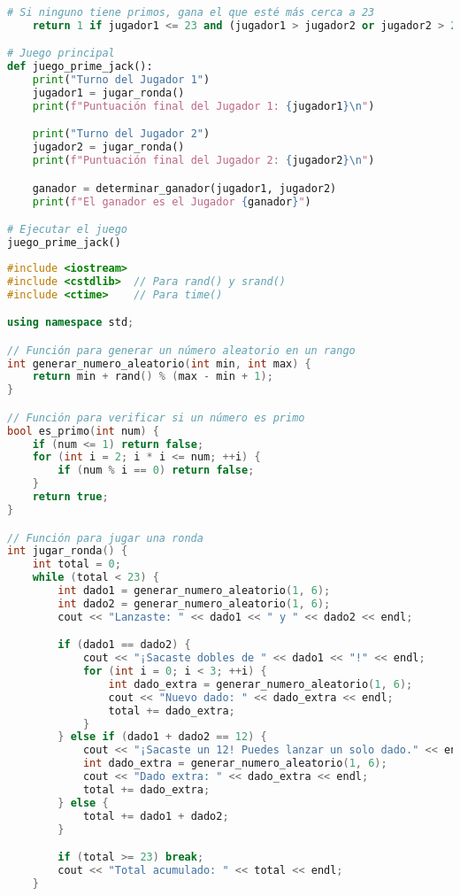 \documentclass{article}
\begin{document}
\begin{lstlisting}[language=Python, caption=Código en Python]
    # Si ninguno tiene primos, gana el que esté más cerca a 23
    return 1 if jugador1 <= 23 and (jugador1 > jugador2 or jugador2 > 23) else 2

# Juego principal
def juego_prime_jack():
    print("Turno del Jugador 1")
    jugador1 = jugar_ronda()
    print(f"Puntuación final del Jugador 1: {jugador1}\n")

    print("Turno del Jugador 2")
    jugador2 = jugar_ronda()
    print(f"Puntuación final del Jugador 2: {jugador2}\n")

    ganador = determinar_ganador(jugador1, jugador2)
    print(f"El ganador es el Jugador {ganador}")

# Ejecutar el juego
juego_prime_jack()

\end{lstlisting}
\begin{lstlisting}[language=C++, Caption=Código en C++]
    #include <iostream>
#include <cstdlib>  // Para rand() y srand()
#include <ctime>    // Para time()

using namespace std;

// Función para generar un número aleatorio en un rango
int generar_numero_aleatorio(int min, int max) {
    return min + rand() % (max - min + 1);
}

// Función para verificar si un número es primo
bool es_primo(int num) {
    if (num <= 1) return false;
    for (int i = 2; i * i <= num; ++i) {
        if (num % i == 0) return false;
    }
    return true;
}

// Función para jugar una ronda
int jugar_ronda() {
    int total = 0;
    while (total < 23) {
        int dado1 = generar_numero_aleatorio(1, 6);
        int dado2 = generar_numero_aleatorio(1, 6);
        cout << "Lanzaste: " << dado1 << " y " << dado2 << endl;

        if (dado1 == dado2) {
            cout << "¡Sacaste dobles de " << dado1 << "!" << endl;
            for (int i = 0; i < 3; ++i) {
                int dado_extra = generar_numero_aleatorio(1, 6);
                cout << "Nuevo dado: " << dado_extra << endl;
                total += dado_extra;
            }
        } else if (dado1 + dado2 == 12) {
            cout << "¡Sacaste un 12! Puedes lanzar un solo dado." << endl;
            int dado_extra = generar_numero_aleatorio(1, 6);
            cout << "Dado extra: " << dado_extra << endl;
            total += dado_extra;
        } else {
            total += dado1 + dado2;
        }

        if (total >= 23) break;
        cout << "Total acumulado: " << total << endl;
    }


\end{lstlisting}
\end{document}
